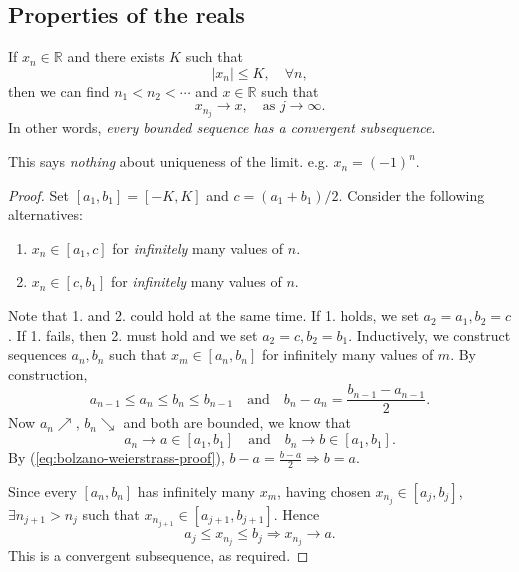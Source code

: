 \subsection{Properties of the reals}
\begin{theorem}\label{thm:bolzano-weierstrass}
    If $ x_n\in \mathbb{R} $ and there exists $K$ such that
    \[
        \left| x_n \right| \le K,\quad \forall n,
    \]
    then we can find $ n_1<n_2<\cdots $ and $x\in \mathbb{R}$ such that 
    \[
        x_{n_j} \to x, \quad \text{as } j\to \infty.
    \]
    In other words, \textit{every bounded sequence has a convergent subsequence}.
\end{theorem}
\begin{remark}
    This says \textit{nothing} about uniqueness of the limit. e.g. $x_n=(-1)^n$.
\end{remark}
\begin{proof}
    Set $ [a_1,b_1] = [-K,K] $ and $ c=(a_1+b_1)/2 $. Consider the following alternatives:
    \begin{enumerate}
        \item $ x_n\in [a_1,c] $ for \textit{infinitely} many values of $n$.
        \item $ x_n\in [c,b_1] $ for \textit{infinitely} many values of $n$.
    \end{enumerate}
    Note that 1. and 2. could hold at the same time. If 1. holds, we set $a_2=a_1, b_2=c$. If 1. fails, then 2. must hold and we set $a_2=c,b_2=b_1$. Inductively, we construct sequences $ a_n,b_n $ such that $ x_m\in [a_n,b_n] $ for infinitely many values of $m$. By construction, 
    \begin{equation}\label{eq:bolzano-weierstrass-proof}\tag{$*$}
        a_{n-1}\le a_n\le b_n\le b_{n-1}\quad\text{and}\quad b_n-a_n = \frac{b_{n-1}-a_{n-1}}{2}.
    \end{equation}
    Now $a_n \nearrow$, $b_n \searrow$ and both are bounded, we know that 
    \[
        a_n\to a\in [a_1,b_1] \quad \text{and}\quad b_n \to b\in [a_1,b_1].
    \]
    By (\ref{eq:bolzano-weierstrass-proof}), $ b-a=\frac{b-a}{2} \Rightarrow b=a $.

    Since every $[a_n,b_n]$ has infinitely many $x_m$, having chosen $ x_{n_j}\in [a_j,b_j] $, $ \exists n_{j+1}>n_j $ such that $ x_{n_{j+1}}\in [a_{j+1},b_{j+1}] $. Hence 
    \[
        a_j\le x_{n_j}\le b_j \Rightarrow x_{n_j}\to a.
    \]
    This is a convergent subsequence, as required.
\end{proof}

